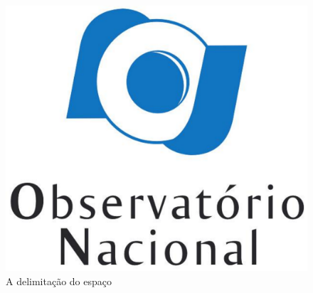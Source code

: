 \begin{figure}[htb]
    \caption{\label{fig_circulo}A delimitação do espaço}
    \begin{center}
    \includegraphics[scale=0.25]{figuras/logo_on.pdf}
    \end{center}
\end{figure}
